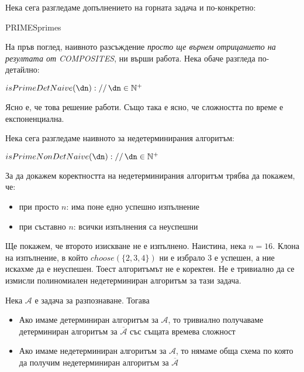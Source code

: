 \leavevmode\newline\noindent
Нека сега разгледаме допълнението на горната задача и по-конкретно:
\begin{boxzzr}{PRIMES}{primes}
\end{boxzzr}
\begin{solution}
	На пръв поглед, наивното разсъждение \emph{просто ще върнем отрицанието на резултата от COMPOSITES}, ни върши работа. Нека обаче разгледа по-детайлно:
	\begin{pseudocode}
		
		$isPrimeDetNaive(\dn)://\,\dn\in\mathbb{N}^+$
		\Mybegin
		{	
		}
	\end{pseudocode}
	Ясно е, че това решение работи. Също така е ясно, че сложността по време е експоненциална.
	
	\vspace{0.3cm}\noindent
	Нека сега разгледаме наивното за недетерминирания алгоритъм:
	\begin{pseudocode}
		\SetKwData{dn}{n}
		
		$isPrimeNonDetNaive(\dn)://\,\dn\in\mathbb{N}^+$
		\Mybegin
		{	
			\KwRet{$\lnot isCompositeNonDet(\dn)$\;}
		}
	\end{pseudocode}
	За да докажем коректността на недетерминирания алгоритъм трябва да покажем, че:
	\begin{itemize}
		\item при просто $n$: има поне едно успешно изпълнение
		\item при съставно $n$: всички изпълнения са неуспешни
	\end{itemize}
	Ще покажем, че второто изискване не е изпълнено. Наистина, нека $n=16$. Клона на изпълнение, в който $choose(\{2,3,4\})$ ни е избрало 3 е успешен, а ние искахме да е неуспешен. Тоест алгоритъмът не е коректен. Не е тривиално да се измисли полиномиален недетерминиран алгоритъм за тази задача.
\end{solution}
\vspace{0.3cm}
\begin{boxremark*}{}
	Нека $\mathscr{A}$ е задача за разпознаване. Тогава
	\begin{itemize}
		\item Ако имаме детерминиран алгоритъм за $\mathscr{A}$, то тривиално получаваме детерминиран алгоритъм за $\overline{\mathscr{A}}$ със същата времева сложност
		\item Ако имаме недетерминиран алгоритъм за $\mathscr{A}$, то нямаме обща схема по която да получим недетерминиран алгоритъм за $\overline{\mathscr{A}}$
	\end{itemize}
\end{boxremark*}